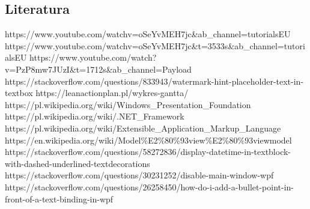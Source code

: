 \newpage
\begin{flushleft}
\section{\LARGE{Literatura}}
\end{flushleft}

\begin{thebibliography}{6}

 https://www.youtube.com/watchv=oSeYvMEH7jc\&ab\_channel=tutorialsEU
 https://www.youtube.com/watchv=oSeYvMEH7jc\&t=3533s\&ab\_channel=tutorialsEU
https://www.youtube.com/watch?v=PzP8mw7JUzI\&t=1712s\&ab\_channel=Payload
https://stackoverflow.com/questions/833943/watermark-hint-placeholder-text-in-textbox
https://leanactionplan.pl/wykres-gantta/
https://pl.wikipedia.org/wiki/Windows\_Presentation\_Foundation
https://pl.wikipedia.org/wiki/.NET\_Framework
https://pl.wikipedia.org/wiki/Extensible\_Application\_Markup\_Language
https://en.wikipedia.org/wiki/Model\%E2\%80\%93view\%E2\%80\%93viewmodel
https://stackoverflow.com/questions/58272836/display-datetime-in-textblock-with-dashed-underlined-textdecorations
https://stackoverflow.com/questions/30231252/disable-main-window-wpf
https://stackoverflow.com/questions/26258450/how-do-i-add-a-bullet-point-in-front-of-a-text-binding-in-wpf
\end{thebibliography}
\newpage